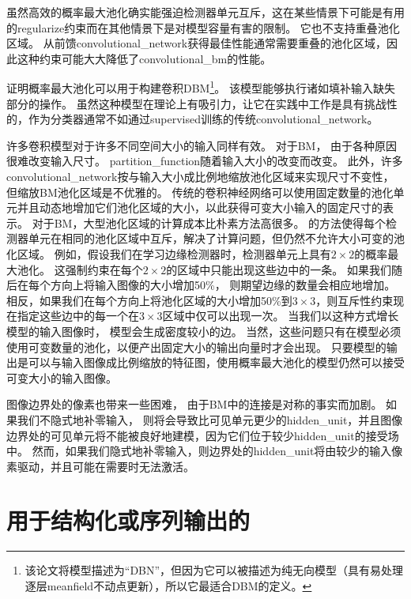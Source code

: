 虽然高效的概率最大池化确实能强迫检测器单元互斥，这在某些情景下可能是有用的\gls{regularize}约束而在其他情景下是对模型容量有害的限制。
它也不支持重叠池化区域。
从前馈\gls{convolutional_network}获得最佳性能通常需要重叠的池化区域，因此这种约束可能大大降低了\gls{convolutional_bm}的性能。

\citet{HonglakL2009} 证明概率最大池化可以用于构建卷积\gls{DBM}\footnote{该论文将模型描述为``\gls{DBN}''，但因为它可以被描述为纯无向模型（具有易处理逐层\gls{meanfield}不动点更新），所以它最适合\gls{DBM}的定义。}。
该模型能够执行诸如填补输入缺失部分的操作。
虽然这种模型在理论上有吸引力，让它在实践中工作是具有挑战性的，作为分类器通常不如通过\gls{supervised}训练的传统\gls{convolutional_network}。


许多卷积模型对于许多不同空间大小的输入同样有效。
对于\gls{BM}， 由于各种原因很难改变输入尺寸。
\gls{partition_function}随着输入大小的改变而改变。
此外，许多\gls{convolutional_network}按与输入大小成比例地缩放池化区域来实现尺寸不变性，但缩放\gls{BM}池化区域是不优雅的。
传统的卷积神经网络可以使用固定数量的池化单元并且动态地增加它们池化区域的大小，以此获得可变大小输入的固定尺寸的表示。
对于\gls{BM}，大型池化区域的计算成本比朴素方法高很多。
 \citet{HonglakL2009} 的方法使得每个检测器单元在相同的池化区域中互斥，解决了计算问题，但仍然不允许大小可变的池化区域。
例如，假设我们在学习边缘检测器时，检测器单元上具有$2 \times 2$的概率最大池化。
这强制约束在每个$2 \times 2$的区域中只能出现这些边中的一条。
如果我们随后在每个方向上将输入图像的大小增加50\%， 则期望边缘的数量会相应地增加。
相反，如果我们在每个方向上将池化区域的大小增加50\%到$3 \times 3 $，则互斥性约束现在指定这些边中的每一个在$3 \times3$区域中仅可以出现一次。
当我们以这种方式增长模型的输入图像时， 模型会生成密度较小的边。
当然，这些问题只有在模型必须使用可变数量的池化，以便产出固定大小的输出向量时才会出现。
只要模型的输出是可以与输入图像成比例缩放的特征图，使用概率最大池化的模型仍然可以接受可变大小的输入图像。

图像边界处的像素也带来一些困难， 由于\gls{BM}中的连接是对称的事实而加剧。
如果我们不隐式地补零输入， 则将会导致比可见单元更少的\gls{hidden_unit}，并且图像边界处的可见单元将不能被良好地建模，因为它们位于较少\gls{hidden_unit}的接受场中。
然而，如果我们隐式地补零输入，则边界处的\gls{hidden_unit}将由较少的输入像素驱动，并且可能在需要时无法激活。


\section{用于结构化或序列输出的}
\label{sec:boltzmann_machines_for_structured_or_sequential_outputs}

